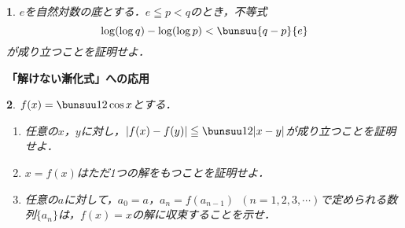\documentclass[10pt,
b5paper,
fleqn,
dvipdfmx,
uplatex
]{jsarticle}
\newtheorem{Q}{}[subsection]
\newtheorem{question}[Question]{}
\newcommand{\bqu}{\begin{question}}
\newcommand{\equ}{\end{question}}
\newcommand{\bQ}{\begin{Q}}
\newcommand{\eQ}{\end{Q}}
\newcommand{\benu}{\begin{enumerate}}
\newcommand{\eenu}{\end{enumerate}}
\newcommand{\bb}{\bf\boldmath}%
\newenvironment{leftbbar}{%
\def\FrameCommand{\color{mygray} \vrule width 5pt \hspace{1zw}
\color{black}}%
\MakeFramed {\advance\hsize-\width \FrameRestore}}%
{\endMakeFramed}
\newenvironment{解答}{
\hspace{-2zw}\phkasen<linethickness=7pt,iro=mygray,kasenUehosei=-3pt>{\bf \large \ 解答\ }\vspace{-1zw}\begin{leftbbar}}{\end{leftbbar}}
\newif\ifkaisetu
\begin{document}
{%

\fi

\vfill

\bQ $e$を自然対数の底とする．$e \leqq p<q$のとき，不等式
\[\log(\log q)-\log(\log p) < \bunsuu{q-p}{e}\]
が成り立つことを証明せよ．
\ifkaisetu \hfill(名大)\fi
\eQ

\ifkaisetu
\begin{解答}\vspace{-2zw}
$f(x)=\log(\log x)$とおくと，$f'(x)=\bunsuu{1}{x\log x}$．\\
{\bb 平均値の定理}より，$p<c<q$となる$c$で
\[\bunsuu{f(q)-f(p)}{q-p}=f'(c)\ \ \ すなわち\ \ \ \bunsuu{\log(\log q)-\log(\log p)}{q-p} = \bunsuu{1}{c\log c}\]
を満たすものが存在する．$p \geqq e$より，$c>e$なので，
\[\bunsuu{1}{c\log c}<\bunsuu{1}{e\log e}=\bunsuu 1e\ \ \ \therefore\ \ \ \bunsuu{\log(\log q)-\log(\log p)}{q-p}<\bunsuu 1e\]
したがって，$\log(\log q)-\log(\log p) < \bunsuu{q-p}{e}$．\hfill □
\end{解答}

\newpage

\fi



{\bb\Large 「解けない漸化式」への応用}

\bQ $f(x)=\bunsuu 12\cos x$とする．
\benu
\item 任意の$x$，$y$に対し，$\left|f(x)-f(y)\right|\leqq \bunsuu 12|x-y|$が成り立つことを証明せよ．
\item $x=f(x)$はただ1つの解をもつことを証明せよ．
\item 任意の$a$に対して，$a_0=a$，$a_n=f(a_{n-1})$\ $(n=1,2,3,\cdots)$で定められる数列$\{a_n\}$は，$f(x)=x$の解に収束することを示せ．\ifkaisetu \hfill(三重大)\fi
\eenu
\eQ

}
\end{document}
